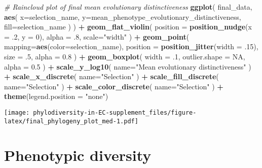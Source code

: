 \documentclass[]{book}
\newenvironment{Shaded}{\begin{snugshade}}{\end{snugshade}}
\newcommand{\CommentTok}[1]{\textcolor[rgb]{0.56,0.35,0.01}{\textit{#1}}}
\newcommand{\DataTypeTok}[1]{\textcolor[rgb]{0.13,0.29,0.53}{#1}}
\newcommand{\DecValTok}[1]{\textcolor[rgb]{0.00,0.00,0.81}{#1}}
\newcommand{\FloatTok}[1]{\textcolor[rgb]{0.00,0.00,0.81}{#1}}
\newcommand{\KeywordTok}[1]{\textcolor[rgb]{0.13,0.29,0.53}{\textbf{#1}}}
\newcommand{\NormalTok}[1]{#1}
\newcommand{\OperatorTok}[1]{\textcolor[rgb]{0.81,0.36,0.00}{\textbf{#1}}}
\newcommand{\OtherTok}[1]{\textcolor[rgb]{0.56,0.35,0.01}{#1}}
\newcommand{\StringTok}[1]{\textcolor[rgb]{0.31,0.60,0.02}{#1}}
\begin{document}
\begin{Shaded}
\begin{Highlighting}[]
\CommentTok{# Raincloud plot of final mean evolutionary distinctiveness}
\KeywordTok{ggplot}\NormalTok{(}
\NormalTok{    final_data,}
    \KeywordTok{aes}\NormalTok{(}
      \DataTypeTok{x=}\NormalTok{selection_name,}
      \DataTypeTok{y=}\NormalTok{mean_phenotype_evolutionary_distinctiveness,}
      \DataTypeTok{fill=}\NormalTok{selection_name}
\NormalTok{    )}
\NormalTok{  ) }\OperatorTok{+}
\StringTok{  }\KeywordTok{geom_flat_violin}\NormalTok{(}
    \DataTypeTok{position =} \KeywordTok{position_nudge}\NormalTok{(}\DataTypeTok{x =} \FloatTok{.2}\NormalTok{, }\DataTypeTok{y =} \DecValTok{0}\NormalTok{),}
    \DataTypeTok{alpha =} \FloatTok{.8}\NormalTok{,}
    \DataTypeTok{scale=}\StringTok{"width"}
\NormalTok{  ) }\OperatorTok{+}
\StringTok{  }\KeywordTok{geom_point}\NormalTok{(}
    \DataTypeTok{mapping=}\KeywordTok{aes}\NormalTok{(}\DataTypeTok{color=}\NormalTok{selection_name),}
    \DataTypeTok{position =} \KeywordTok{position_jitter}\NormalTok{(}\DataTypeTok{width =} \FloatTok{.15}\NormalTok{),}
    \DataTypeTok{size =} \FloatTok{.5}\NormalTok{,}
    \DataTypeTok{alpha =} \FloatTok{0.8}
\NormalTok{  ) }\OperatorTok{+}
\StringTok{  }\KeywordTok{geom_boxplot}\NormalTok{(}
    \DataTypeTok{width =} \FloatTok{.1}\NormalTok{,}
    \DataTypeTok{outlier.shape =} \OtherTok{NA}\NormalTok{,}
    \DataTypeTok{alpha =} \FloatTok{0.5}
\NormalTok{  ) }\OperatorTok{+}
\StringTok{  }\KeywordTok{scale_y_log10}\NormalTok{(}
    \DataTypeTok{name=}\StringTok{"Mean evolutionary distinctiveness"}
\NormalTok{  ) }\OperatorTok{+}
\StringTok{  }\KeywordTok{scale_x_discrete}\NormalTok{(}
    \DataTypeTok{name=}\StringTok{"Selection"}
\NormalTok{  ) }\OperatorTok{+}
\StringTok{  }\KeywordTok{scale_fill_discrete}\NormalTok{(}
    \DataTypeTok{name=}\StringTok{"Selection"}
\NormalTok{  ) }\OperatorTok{+}
\StringTok{  }\KeywordTok{scale_color_discrete}\NormalTok{(}
    \DataTypeTok{name=}\StringTok{"Selection"}
\NormalTok{  ) }\OperatorTok{+}\StringTok{ }
\StringTok{  }\KeywordTok{theme}\NormalTok{(}\DataTypeTok{legend.position =} \StringTok{"none"}\NormalTok{)}
\end{Highlighting}
\end{Shaded}

\texttt{[image: phylodiversity-in-EC-supplement\_files/figure-latex/final\_phylogeny\_plot\_med-1.pdf]}

\hypertarget{phenotypic-diversity}{%
\section{Phenotypic diversity}\label{phenotypic-diversity}}
\end{document}
